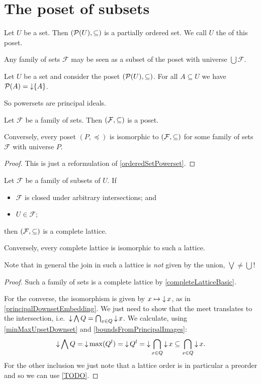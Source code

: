 \chapter{The poset of subsets}
\begin{definition}
Let $U$ be a set. Then $\sSet{\powerset(U), \subseteq}$ is a partially ordered set. We call $U$ the  of this poset.
\end{definition}

Any family of sets $\mathcal{F}$ may be seen as a subset of the poset with universe $\bigcup \mathcal{F}$.


\begin{lemma}
Let $U$ be a set and consider the poset $\sSet{\powerset(U), \subseteq}$. For all $A\subseteq U$ we have $\operatorname{\mathcal{P}}(A) = \operatorname{\downarrow}\{A\}$.
\end{lemma}
So powersets are principal ideals.

\begin{proposition} \label{posetPowerset}
Let $\mathcal{F}$ be a family of sets. Then $\sSet{\mathcal{F}, \subseteq}$ is a poset.

Conversely, every poset $(P,\preceq)$ is isomorphic to $\sSet{\mathcal{F}, \subseteq}$ for some family of sets $\mathcal{F}$ with universe $P$.
\end{proposition}
\begin{proof}
This is just a reformulation of \ref{orderedSetPowerset}.
\end{proof}
\begin{corollary} \label{MooreFamily}
Let $\mathcal{F}$ be a family of subsets of $U$. If
\begin{itemize}
\item $\mathcal{F}$ is closed under arbitrary intersections; and
\item $U \in \mathcal{F}$;
\end{itemize}
then $\sSet{\mathcal{F},\subseteq}$ is a complete lattice.

Conversely, every complete lattice is isomorphic to such a lattice.
\end{corollary}
Note that in general the join in such a lattice is \emph{not} given by the union, $\bigvee \neq \bigcup$!
\begin{proof}
Such a family of sets is a complete lattice by \ref{completeLatticeBasic}.

For the converse, the isomorphism is given by $x\mapsto \operatorname{\downarrow} x$, as in \ref{principalDownsetEmbedding}. We just need to show that the meet translates to the intersection, i.e.\ $\operatorname{\downarrow} \bigwedge Q = \bigcap_{x\in Q}\operatorname{\downarrow} x$. We calculate, using \ref{minMaxUpsetDownset} and \ref{boundsFromPrincipalImages}:
\[ \operatorname{\downarrow} \bigwedge Q = \operatorname{\downarrow} \max(Q^l) = \operatorname{\downarrow} Q^l = \operatorname{\downarrow} \bigcap_{x\in Q} \operatorname{\downarrow} x \subseteq \bigcap_{x\in Q} \operatorname{\downarrow} x. \]
For the other inclusion we just note that a lattice order is in particular a  preorder and so we can use \ref{TODO}.
\end{proof}

